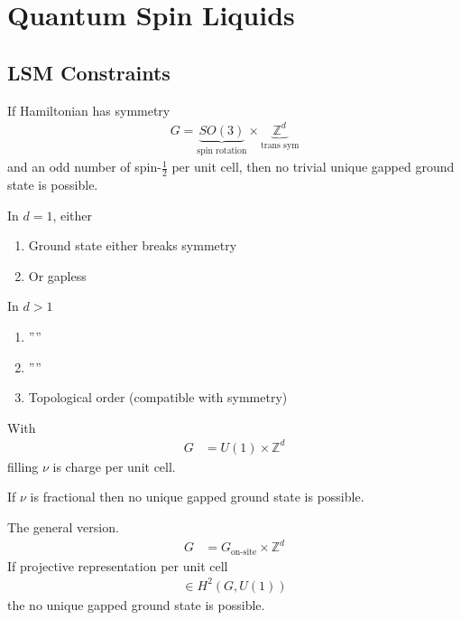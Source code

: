 \section{Quantum Spin Liquids}
\subsection{LSM Constraints}
If Hamiltonian has symmetry
\begin{align}
    G = \underbrace{SO(3)}_{\text{spin rotation}}\times
    \underbrace{ \mathbb{Z}^d}_{\text{trans sym}}
\end{align}
and an odd number of spin-$\frac{1}{2}$ per unit cell,
then no trivial unique gapped ground state is possible.

In $d=1$, either
\begin{enumerate}
    \item Ground state either breaks symmetry
    \item Or gapless
\end{enumerate}
In $d>1$
\begin{enumerate}
    \item  ''''
    \item ''''
    \item Topological order (compatible with symmetry)
\end{enumerate}
With
\begin{align}
    G &= U(1) \times \mathbb{Z}^d
\end{align}
filling $\nu$ is charge per unit cell.

If $\nu$ is fractional then no unique gapped ground state is possible.

The general version.
\begin{align}
    G &=
    G_{\textrm{on-site}} \times \mathbb{Z}^d
\end{align}
If projective representation per unit cell
\begin{align}
    [w] \in H^2 \left( G, U(1) \right)
\end{align}
the no unique gapped ground state is possible.

